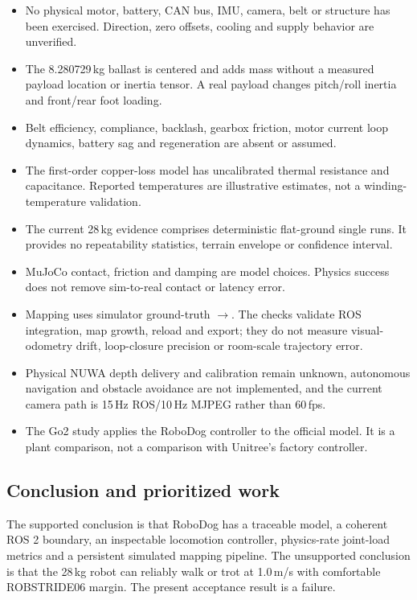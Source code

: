 \documentclass[11pt,a4paper]{article}
\begin{document}
\begin{itemize}
\item No physical motor, battery, CAN bus, IMU, camera, belt or structure has
      been exercised. Direction, zero offsets, cooling and supply behavior are
      unverified.
\item The 8.280729\,kg ballast is centered and adds mass without a measured
      payload location or inertia tensor. A real payload changes pitch/roll
      inertia and front/rear foot loading.
\item Belt efficiency, compliance, backlash, gearbox friction, motor current
      loop dynamics, battery sag and regeneration are absent or assumed.
\item The first-order copper-loss model has uncalibrated thermal resistance and
      capacitance. Reported temperatures are illustrative estimates, not a
      winding-temperature validation.
\item The current 28\,kg evidence comprises deterministic flat-ground single
      runs. It provides no repeatability statistics, terrain envelope or
      confidence interval.
\item MuJoCo contact, friction and damping are model choices. Physics success
      does not remove sim-to-real contact or latency error.
\item Mapping uses simulator ground-truth $\to$.
      The checks validate ROS integration, map growth, reload and export; they
      do not measure visual-odometry drift, loop-closure precision or room-scale
      trajectory error.
\item Physical NUWA depth delivery and calibration remain unknown, autonomous
      navigation and obstacle avoidance are not implemented, and the current
      camera path is 15\,Hz ROS/10\,Hz MJPEG rather than 60\,fps.
\item The Go2 study applies the RoboDog controller to the official model. It is
      a plant comparison, not a comparison with Unitree's factory controller.
\end{itemize}

\subsection{Conclusion and prioritized work}

The supported conclusion is that RoboDog has a traceable model, a coherent ROS
2 boundary, an inspectable locomotion controller, physics-rate joint-load
metrics and a persistent simulated mapping pipeline. The unsupported
conclusion is that the 28\,kg robot can reliably walk or trot at 1.0\,m/s with
comfortable ROBSTRIDE06 margin. The present acceptance result is a failure.
\end{document}
